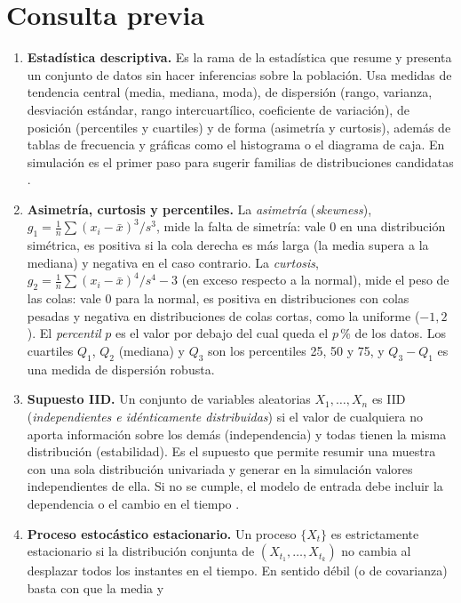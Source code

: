 \documentclass[11pt,a4paper]{article}
\begin{document}
\section{Consulta previa}
\begin{enumerate}[label=\arabic*.]
 \item \textbf{Estadística descriptiva.} Es la rama de la estadística que resume y presenta un
 conjunto de datos sin hacer inferencias sobre la población. Usa medidas de tendencia central
 (media, mediana, moda), de dispersión (rango, varianza, desviación estándar, rango
 intercuartílico, coeficiente de variación), de posición (percentiles y cuartiles) y de forma
 (asimetría y curtosis), además de tablas de frecuencia y gráficas como el histograma o el
 diagrama de caja. En simulación es el primer paso para sugerir familias de distribuciones
 candidatas \cite[Sec.~3.5]{banks1998}.
 \item \textbf{Asimetría, curtosis y percentiles.} La \emph{asimetría} (\emph{skewness}),
 $g_1=\frac{1}{n}\sum(x_i-\bar x)^3/s^3$, mide la falta de simetría: vale 0 en una
 distribución simétrica, es positiva si la cola derecha es más larga (la media supera a la
 mediana) y negativa en el caso contrario. La \emph{curtosis},
 $g_2=\frac{1}{n}\sum(x_i-\bar x)^4/s^4-3$ (en exceso respecto a la normal), mide el peso de las
 colas: vale 0 para la normal, es positiva en distribuciones con colas pesadas y negativa en
 distribuciones de colas cortas, como la uniforme ($-1{,}2$). El \emph{percentil} $p$ es el
 valor por debajo del cual queda el $p\,\%$ de los datos. Los cuartiles $Q_1$, $Q_2$ (mediana)
 y $Q_3$ son los percentiles 25, 50 y 75, y $Q_3-Q_1$ es una medida de dispersión robusta.
 \item \textbf{Supuesto IID.} Un conjunto de variables aleatorias $X_1,\dots,X_n$ es IID
 (\emph{independientes e idénticamente distribuidas}) si el valor de cualquiera no aporta
 información sobre los demás (independencia) y todas tienen la misma distribución
 (estabilidad). Es el supuesto que permite resumir una muestra con una sola distribución
 univariada y generar en la simulación valores independientes de ella. Si no se cumple, el
 modelo de entrada debe incluir la dependencia o el cambio en el tiempo
 \cite[Sec.~3.4 y 3.6]{banks1998}.
 \item \textbf{Proceso estocástico estacionario.} Un proceso $\{X_t\}$ es estrictamente
 estacionario si la distribución conjunta de $(X_{t_1},\dots,X_{t_k})$ no cambia al desplazar
 todos los instantes en el tiempo. En sentido débil (o de covarianza) basta con que la media y

\end{enumerate}
\end{document}
